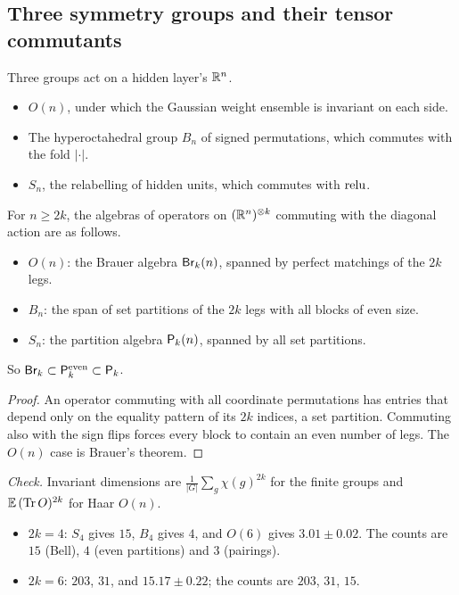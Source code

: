 \label{sec:commutant}
\subsection{Three symmetry groups and their tensor commutants}
Three groups act on a hidden layer's $\mathbb R^n$.
\begin{itemize}[leftmargin=*]
\item $O(n)$, under which the Gaussian weight ensemble is invariant on each side.
\item The hyperoctahedral group $B_n$ of signed permutations, which commutes with the fold $|\cdot|$.
\item $S_n$, the relabelling of hidden units, which commutes with $\operatorname{relu}$.
\end{itemize}
\begin{theorem}\label{thm:tower}
For $n\ge2k$, the algebras of operators on $(\mathbb R^n)^{\otimes k}$ commuting with the diagonal action are as follows.
\begin{itemize}[leftmargin=*]
\item $O(n)$: the Brauer algebra $\mathsf{Br}_k(n)$, spanned by perfect matchings of the $2k$ legs.
\item $B_n$: the span of set partitions of the $2k$ legs with all blocks of even size.
\item $S_n$: the partition algebra $\mathsf P_k(n)$, spanned by all set partitions.
\end{itemize}
So $\mathsf{Br}_k\subset\mathsf P^{\rm even}_k\subset\mathsf P_k$.
\end{theorem}
\begin{proof}
An operator commuting with all coordinate permutations has entries that depend only on the equality pattern of its $2k$ indices, a set
partition. Commuting also with the sign flips forces every block to contain an even number of legs. The $O(n)$ case is Brauer's
theorem.
\end{proof}
\emph{Check.} Invariant dimensions are $\frac1{|G|}\sum_g\chi(g)^{2k}$ for the finite groups and $\mathbb E\,(\operatorname{Tr} O)^{2k}$ for Haar $O(n)$.
\begin{itemize}[leftmargin=*]
\item $2k=4$: $S_4$ gives $15$, $B_4$ gives $4$, and $O(6)$ gives $3.01\pm0.02$. The counts are $15$ (Bell), $4$ (even
partitions) and $3$ (pairings).
\item $2k=6$: $203$, $31$, and $15.17\pm0.22$; the counts are $203$, $31$, $15$.
\end{itemize}

